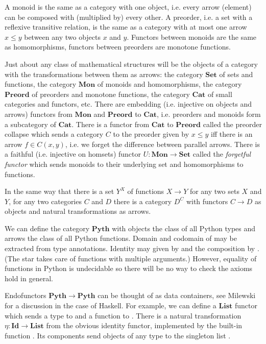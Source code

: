 \begin{example}
A monoid is the same as a category with one object, i.e. every arrow (element) can be composed with (multiplied by) every other.
A preorder, i.e. a set with a reflexive transitive relation, is the same as a category with at most one arrow $x \leq y$ between any two objects $x$ and $y$.
Functors between monoids are the same as homomorphisms, functors between preorders are monotone functions.
\end{example}

\begin{example}
Just about any class of mathematical structures will be the objects of a category with the transformations between them as arrows: the category $\mathbf{Set}$ of sets and functions, the category $\mathbf{Mon}$ of monoids and homomorphisms, the category $\mathbf{Preord}$ of preorders and monotone functions, the category $\mathbf{Cat}$ of small categories and functors, etc.
There are embedding (i.e. injective on objects and arrows) functors from $\mathbf{Mon}$ and $\mathbf{Preord}$ to $\mathbf{Cat}$, i.e. preorders and monoids form a subcategory of $\mathbf{Cat}$.
There is a functor from $\mathbf{Cat}$ to $\mathbf{Preord}$ called the preorder collapse which sends a category $C$ to the preorder given by $x \leq y$ iff there is an arrow $f \in C(x, y)$, i.e. we forget the difference between parallel arrows.
There is a faithful (i.e. injective on homsets) functor $U : \mathbf{Mon} \to \mathbf{Set}$ called the \emph{forgetful functor} which sends monoids to their underlying set and homomorphisms to functions.
\end{example}

\begin{example}
In the same way that there is a set $Y^X$ of functions $X \to Y$ for any two sets $X$ and $Y$, for any two categories $C$ and $D$ there is a category $D^C$ with functors $C \to D$ as objects and natural transformations as arrows.
\end{example}

\begin{example}\label{ex:python categories}
We can define the category $\mathbf{Pyth}$ with objects the class of all Python types and arrows the class of all Python functions.
Domain and codomain of may be extracted from type annotations.
Identity may given by  and the composition by . (The star takes care of functions with multiple arguments.)
However, equality of functions in Python is undecidable so there will be no way to check the axioms hold in general.

Endofunctors $\mathbf{Pyth} \to \mathbf{Pyth}$ can be thought of as data containers, see Milewski~\cite{Milewski14} for a discussion in the case of Haskell.
For example, we can define a $\mathbf{List}$ functor which sends a type  to  and a function  to .
There is a natural transformation $\eta : \mathbf{Id} \to \mathbf{List}$ from the obvious identity functor, implemented by the built-in function .
Its components send objects  of any type  to the singleton list .
\end{example}

